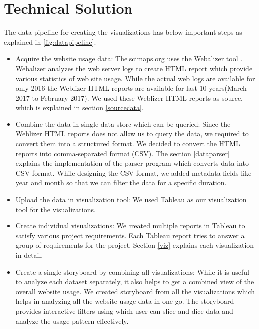 \section{Technical Solution} \label{techsol}

The data pipeline for creating the visualizations has below important steps
as explained in \ref{fig:datapipeline}.

\begin{itemize}
\item Acquire the website usage data:
The scimaps.org uses the Webalizer tool \cite{weblizer}.
Webalizer
analyzes the web server logs to create HTML report which provide various
statistics of web site usage. While the actual web logs are available for
only 2016 the Weblizer HTML reports are available for last 10 years(March
2017 to February 2017). We used these Weblizer HTML reports as source, which is explained in section \ref{sourcedata}.

\item Combine the data in single data store which can be queried:
Since the Weblizer HTML reports does not allow us to query the data, we
required to convert them into a structured format. We decided to convert the
HTML reports into comma-separated format (CSV). The section \ref{dataparser}
explains the implementation of the parser program which converts data into
CSV format. While designing the CSV format, we added metadata fields like
year and month so that we can filter the data for a specific duration.

\item Upload the data in visualization tool:
We used Tableau \cite{tableau} as our visualization tool for the
visualizations. 
\item Create individual visualizations:
We created multiple reports in Tableau to satisfy various project
requirements. Each Tableau report tries to answer a group of requirements for
 the project.  Section \ref{viz} explains
 each visualization in detail.
\item Create a single storyboard by combining all visualizations:
While it is useful to analyze each dataset separately, it also helps to get a
 combined view of the overall website usage. We created storyboard from all
 the visualizations which helps in analyzing all the website usage data in
 one go. The storyboard provides interactive filters using which user can
 slice and dice data and analyze the usage pattern effectively.
\end{itemize}

